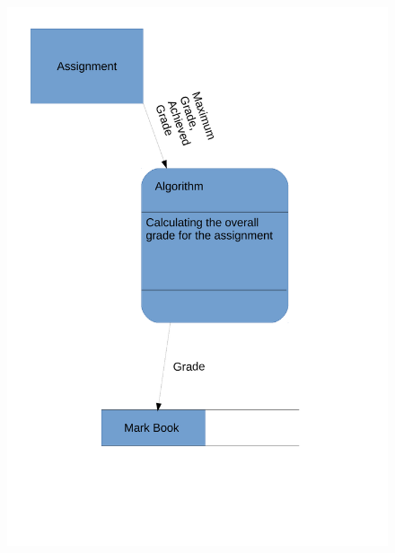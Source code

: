 \begin{figure}[H]
    \includegraphics[width=\textwidth]{./Analysis/images/DataFlowDiagrams.pdf}
\end{figure}


